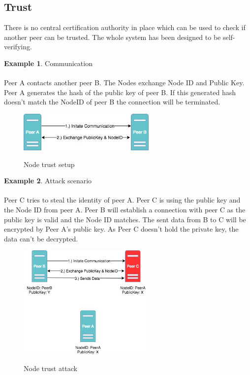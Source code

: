 \documentclass[a4paper,11pt, oneside]{report}
\theoremstyle{definition}
\newtheorem{exmp}{Example}[subsection]
\begin{document}
\subsection{Trust}
There is no central certification authority in place which can be used to check if another peer can be trusted. The whole system has been designed to be self-verifying.\\[0.3cm]
\begin{exmp} Communication\\ \\
Peer A contacts another peer B. The Nodes exchange Node ID and Public Key.
Peer A generates the hash of the public key of peer B. If this generated hash doesn't match the NodeID of peer B the connection will be terminated.\\[0.3cm]
\begin{figure}[H]
\centering
\includegraphics[width=0.6\textwidth]{img/ipfs_peertrust_scenario_init.jpg}\\[0.2cm]
\caption[Node trust]{Node trust setup}
\end{figure}
\end{exmp}
\newpage
\begin{exmp}  Attack scenario\\ \\
Peer C tries to steal the identity of peer A. Peer C is using the public key and the Node ID from peer A. Peer B will establish a connection with peer C as the public key is valid and the Node ID matches. The sent data from B to C will be encrypted by Peer A's public key. As Peer C doesn't hold the private key, the data can't be decrypted.
\begin{figure}[H]
\centering
\includegraphics[width=0.6\textwidth]{img/ipfs_peertrust_scenario_attack.jpg}\\[0.2cm]
\caption[Node trust attack]{Node trust attack}
\end{figure}
\end{exmp}
\end{document}
